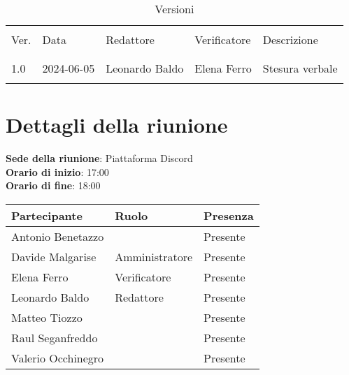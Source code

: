 \documentclass[italian,12pt]{article}
\begin{document}


\newpage



\begin{table}[!h]
	\caption{Versioni}
	\footnotesize
	\begin{center}
		\begin{tabular}{ l l l l p{6cm} }
			\hline                                                                           \\[-2ex]
			Ver. & Data       & Redattore       & Verificatore       & Descrizione           \\
			\\[-2ex] \hline \\[-1.5ex]
			1.0  & 2024-06-05 & Leonardo Baldo & Elena Ferro & Stesura verbale \\
			\\[-1.5ex] \hline
		\end{tabular}
	\end{center}
\end{table}
\newpage

\tableofcontents

\newpage

\section{Dettagli della riunione}


\textbf{Sede della riunione}: Piattaforma Discord\\
\textbf{Orario di inizio}: 17:00\\
\textbf{Orario di fine}: 18:00\\


\begin{flushleft}
	\begin{table}[!h]
		\begin{tabular}{ |l|l|l| }
			\hline
			\textbf{Partecipante} & \textbf{Ruolo} & \textbf{Presenza} \\
			\hline
			Antonio Benetazzo     &                & Presente          \\
			Davide Malgarise      & Amministratore & Presente          \\
			Elena Ferro           & Verificatore   & Presente          \\
			Leonardo Baldo        & Redattore      & Presente          \\
			Matteo Tiozzo         &                & Presente          \\
			Raul Seganfreddo      &                & Presente          \\
			Valerio Occhinegro    &                & Presente          \\
			\hline
		\end{tabular}
	\end{table}
\end{flushleft}
\end{document}

